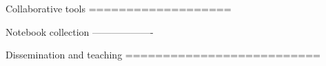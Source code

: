

Collaborative tools
===================

Notebook collection
-------------------


Dissemination and teaching
==========================

